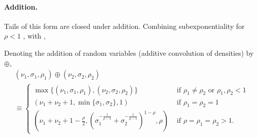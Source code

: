 \documentclass[../thesis.tex]{subfiles}
\begin{document}
\paragraph{Addition.} Tails of this form are  closed under addition. Combining subexponentiality for $\rho < 1$
\cite[Chapter X.1]{asmussen2010ruin},
with \cite[Thm 3.1 \& eqn. (8.3)]{asmussen2017tail},
\begin{proposition}
  \label{prop:gga_add}
  Denoting the addition of random variables (additive convolution of densities) by $\oplus$,
  \begin{multline}
    (\nu_{1},\sigma_{1},\rho_{1})\oplus(\nu_{2},\sigma_{2},\rho_{2})
    \\\equiv \begin{cases}
      \max\{(\nu_{1},\sigma_{1},\rho_{1}),(\nu_{2},\sigma_{2},\rho_{2})\}                                              & \text{ if }\rho_{1}\neq\rho_{2}\text{ or }\rho_{1},\rho_{2}<1 \\
      \left(\nu_{1}+\nu_{2}+1,\min\{\sigma_{1},\sigma_{2}\},1\right)                                                   & \text{ if }\rho_{1}=\rho_{2}=1                                \\
      (\nu_{1}+\nu_{2}+1-\frac{\rho}{2},(\sigma_{1}^{-\frac{1}{\rho-1}}+\sigma_{2}^{-\frac{1}{\rho-1}})^{1-\rho},\rho) & \text{ if }\rho=\rho_{1}=\rho_{2}>1.
    \end{cases}
  \end{multline}
\end{proposition}
\end{document}
